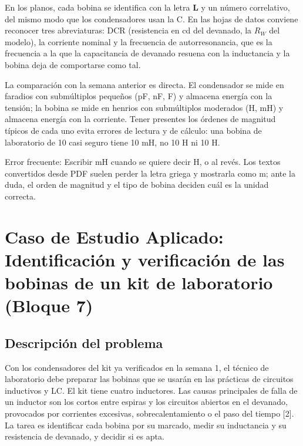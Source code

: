 \documentclass[11pt,letterpaper]{article}
\begin{document}
En los planos, cada bobina se identifica con la letra \textbf{L} y un número correlativo, del mismo modo que los condensadores usan la C. En las hojas de datos conviene reconocer tres abreviaturas: DCR (resistencia en cd del devanado, la $R_W$ del modelo), la corriente nominal y la frecuencia de autorresonancia, que es la frecuencia a la que la capacitancia de devanado resuena con la inductancia y la bobina deja de comportarse como tal.

La comparación con la semana anterior es directa. El condensador se mide en faradios con submúltiplos pequeños (pF, nF, \textmu{}F) y almacena energía con la tensión; la bobina se mide en henrios con submúltiplos moderados (\textmu{}H, mH) y almacena energía con la corriente. Tener presentes los órdenes de magnitud típicos de cada uno evita errores de lectura y de cálculo: una bobina de laboratorio de \guillemotleft{}10\guillemotright{} casi seguro tiene 10 mH, no 10 H ni 10 \textmu{}H.

\begin{nota}{Error frecuente:}
Escribir \guillemotleft{}mH\guillemotright{} cuando se quiere decir \guillemotleft{}\textmu{}H\guillemotright{}, o al revés. Los textos convertidos desde PDF suelen perder la letra griega \textmu{} y mostrarla como \guillemotleft{}m\guillemotright{}; ante la duda, el orden de magnitud y el tipo de bobina deciden cuál es la unidad correcta.
\end{nota}

\section{Caso de Estudio Aplicado: Identificación y verificación de las bobinas de un kit de laboratorio (Bloque 7)}

\subsection{Descripción del problema}

Con los condensadores del kit ya verificados en la semana 1, el técnico de laboratorio debe preparar las bobinas que se usarán en las prácticas de circuitos inductivos y LC. El kit tiene cuatro inductores. Las causas principales de falla de un inductor son los cortos entre espiras y los circuitos abiertos en el devanado, provocados por corrientes excesivas, sobrecalentamiento o el paso del tiempo [2]. La tarea es identificar cada bobina por su marcado, medir su inductancia y su resistencia de devanado, y decidir si es apta.
\end{document}
